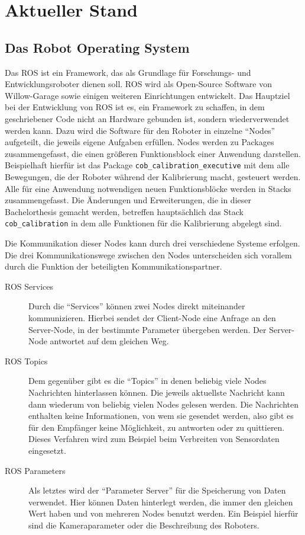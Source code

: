 \chapter{Aktueller Stand}

\section{Das Robot Operating System}

Das \acl{ROS} ist ein Framework, das als Grundlage für Forschungs- und
Entwicklungsroboter dienen soll. \ac{ROS} wird als Open-Source Software von
Willow-Garage sowie einigen weiteren Einrichtungen entwickelt. Das Hauptziel bei
der Entwicklung von \ac{ROS} ist es, ein Framework zu schaffen, in dem
geschriebener Code nicht an Hardware gebunden ist, sondern wiederverwendet
werden kann. Dazu wird die Software für den Roboter in einzelne ``Nodes''
aufgeteilt, die jeweils eigene Aufgaben erfüllen. Nodes werden zu Packages
zusammengefasst, die einen größeren Funktionsblock einer Anwendung darstellen.
Beispielhaft hierfür ist das Package \texttt{cob\_calibration\_executive} mit
dem alle Bewegungen, die der Roboter während der Kalibrierung macht, gesteuert
werden. Alle für eine Anwendung notwendigen neuen Funktionsblöcke werden in
Stacks zusammengefasst. Die Änderungen und Erweiterungen, die in dieser
Bachelorthesis gemacht werden, betreffen hauptsächlich das Stack
\texttt{cob\_calibration} in dem alle Funktionen für die Kalibrierung abgelegt
sind. 

Die Kommunikation dieser Nodes kann durch drei verschiedene Systeme erfolgen.
Die drei Kommunikationswege zwischen den Nodes unterscheiden sich vorallem
durch die Funktion der beteiligten Kommunikationspartner. 

\begin{description}

  \item[\ac{ROS} Services] Durch die ``Services'' können zwei Nodes direkt
    miteinander kommunizieren. Hierbei sendet der Client-Node eine Anfrage an
    den Server-Node, in der bestimmte Parameter übergeben werden. Der
    Server-Node antwortet auf dem gleichen Weg.


  \item[\ac{ROS} Topics]Dem gegenüber gibt es die ``Topics'' in denen beliebig
    viele Nodes Nachrichten hinterlassen können. Die jeweils aktuellste
    Nachricht kann dann wiederum von beliebig vielen Nodes gelesen werden. Die
    Nachrichten enthalten keine Informationen, von wem sie gesendet werden, also
    gibt es für den Empfänger keine Möglichkeit, zu antworten oder zu quittieren.
    Dieses Verfahren wird zum Beispiel beim Verbreiten von Sensordaten
    eingesetzt.


  \item[\ac{ROS} Parameters]Als letztes wird der ``Parameter Server'' für die
    Speicherung von Daten verwendet. Hier können Daten hinterlegt werden, die
    immer den gleichen Wert haben und von mehreren Nodes benutzt werden. Ein
    Beispiel hierfür sind die Kameraparameter oder die Beschreibung des
    Roboters. 

\end{description}


